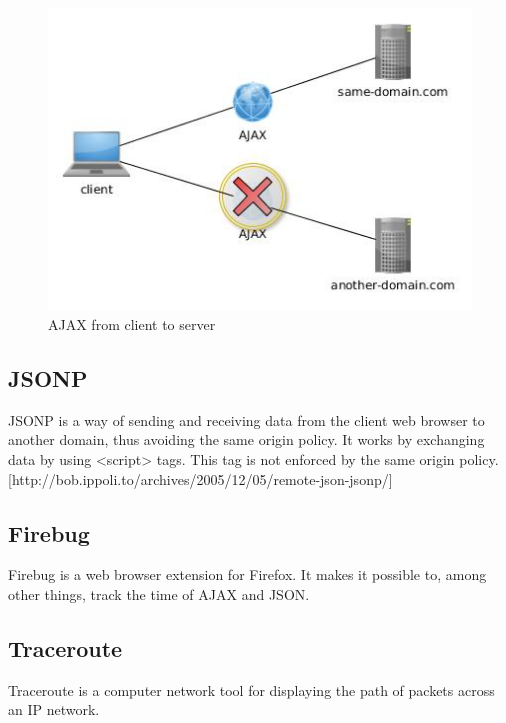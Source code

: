 \documentclass[10pt,a4paper]{article}
\begin{document}
\begin{figure}
\centering
\includegraphics[width=\linewidth]{../ajax/ajax}
\caption{AJAX from client to server}
\label{AJAX}
\end{figure}


\subsection{JSONP}
JSONP is a way of sending and receiving data from the client web browser to another domain, thus avoiding the same origin policy. It works by exchanging data by using <script> tags. This tag is not enforced by the same origin policy. [http://bob.ippoli.to/archives/2005/12/05/remote-json-jsonp/]
\subsection{Firebug}
Firebug is a web browser extension for Firefox. It makes it possible to, among other things, track the time of AJAX and JSON.

\subsection{Traceroute}
Traceroute is a computer network tool for displaying the path of packets across an IP network.
\end{document}
